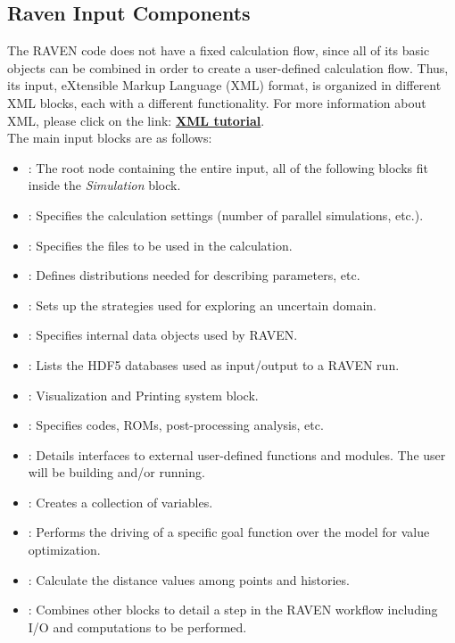 \subsection{Raven Input Components}
\label{sub:InputStructure}
The RAVEN code does not have a fixed calculation flow, since all of its basic
objects can be combined in order to create a user-defined calculation flow.
%
Thus, its input, eXtensible Markup Language (XML) format, is organized in different XML blocks, each with a
different functionality. For more information about XML, please click on the link:
\href{https://www.w3schools.com/xml/default.asp}{\textbf{XML tutorial}}.
%
\\The main input blocks are as follows:
\begin{itemize}
  \item {}: The root node containing the
  entire input, all of
  the following blocks fit inside the \emph{Simulation} block.
  \item {}: Specifies the calculation
  settings (number of parallel simulations, etc.).
  \item {}: Specifies the files to be
  used in the calculation.
  \item {}: Defines distributions
  needed for describing parameters, etc.
  \item {}: Sets up the strategies used for
  exploring an uncertain domain.
  \item {}: Specifies internal data objects
  used by RAVEN.
  \item {}: Lists the HDF5 databases used
  as input/output to a
  RAVEN run.
  \item {}: Visualization and
  Printing system block.
  \item {}: Specifies codes, ROMs,
  post-processing analysis, etc.
  \item {}: Details interfaces to external
  user-defined functions and modules. The user will be building and/or running.
  \item {}: Creates a collection of variables.
  \item {}: Performs the driving of a specific goal function over
  the model for value optimization.
  \item {}: Calculate the distance values among points and histories.
  \item {}: Combines other blocks to detail a
  step in the RAVEN workflow including I/O and computations to be performed.
\end{itemize}

